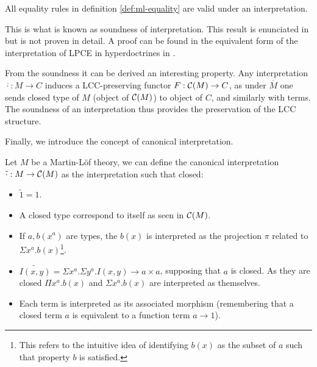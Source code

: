 \begin{definition}
\begin{proposition}[Soundness]
All equality rules in definition \ref{def:ml-equality} are valid under an interpretation.
\end{proposition}


This is what is known as soundness of interpretation. This result is enunciated in \cite[proposition 4.5]{seely1984locally} but is not proven in detail. A proof can be found in the equivalent form of the interpretation of LPCE in hyperdoctrines in \cite{seely1983hyperdoctrines}.

\begin{remark}\label{rem:induced-functor} From the soundness it can be derived an interesting property. Any interpretation $\overline{\cdot}: M \to C$ induces a LCC-preserving functor $F:\mathcal{C} (M) \to C$, as under $\overline M$ one sends closed type of $M$ (object of $\mathcal{C} (M)$) to object of $C$, and similarly with terms. The soundness of an interpretation thus provides the preservation of the LCC structure. 
\end{remark}


Finally, we introduce the concept of canonical interpretation.

\begin{definition}
  Let $M$ be a Martin-L\"of theory, we can define the canonical interpretation $\tilde \cdot: M\to \mathcal{C}(M)$ as the interpretation such that closed:
  \begin{itemize}
  \item $\tilde 1 = 1$.
  \item A closed type correspond to itself as seen in $\mathcal{C}(M)$.
  \item If $a, b(x^a)$ are types, the $b(x)$ is interpreted as the projection  $\pi$ related to  $\Sigma x^a.b(x)$\footnote{This refers to the intuitive idea of identifying $b(x)$ as the subset of $a$ such that property $b$ is satisfied.}.
  \item $\widetilde{I(x,y)} = \Sigma x^a.\Sigma y^a. I(x,y) \to a\times a$, supposing that $a$ is closed. As they are closed $\Pi x^a.b(x)$ and $\Sigma x^a.b(x)$ are interpreted as themselves.
  \item Each term is interpreted as its associated morphism (remembering that a closed term $a$ is equivalent to a function term $a\to 1$).
  \end{itemize}
\end{definition}


\end{definition}
